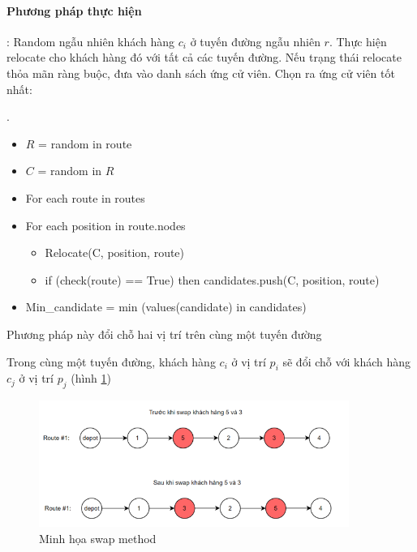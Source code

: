 \documentclass[12pt,a4paper]{article}\author{Nguyễn Nho Dũng}
\begin{document}
\paragraph{Phương pháp thực hiện}: Random ngẫu nhiên khách hàng $c_i$ ở tuyến đường ngẫu nhiên $r$. Thực hiện relocate cho khách hàng đó với tất cả các tuyến đường. Nếu trạng thái relocate thỏa mãn ràng buộc, đưa vào danh sách ứng cử viên. Chọn ra ứng cử viên tốt nhất:
\begin{thuattoan}
	.
	\begin{itemize}
		\item $R$ = random in route
		\item $C$ = random in $R$
		\item For each route in routes
		\item For each position in route.nodes
		\begin{itemize}
			\item Relocate(C, position, route)
			\item if (check(route) == True) then candidates.push(C, position, route)
		\end{itemize}
		\item Min\_candidate = min (values(candidate) in candidates)
	\end{itemize}
\end{thuattoan}
\begin{pphap}
	Phương pháp này đổi chỗ hai vị trí trên cùng một tuyến đường
\end{pphap}
\begin{vd}
	Trong cùng một tuyến đường, khách hàng $c_i$ ở vị trí $p_i$ sẽ đổi chỗ với khách hàng $c_j$ ở vị trí $p_j$ (hình \ref{swap_method})
\begin{figure}[H]
	\centering
	\includegraphics[width=0.9\textwidth]{Anh/swap_method}
	\caption{Minh họa swap method}
	\label{swap_method}
\end{figure}
\end{vd}
\end{document}
